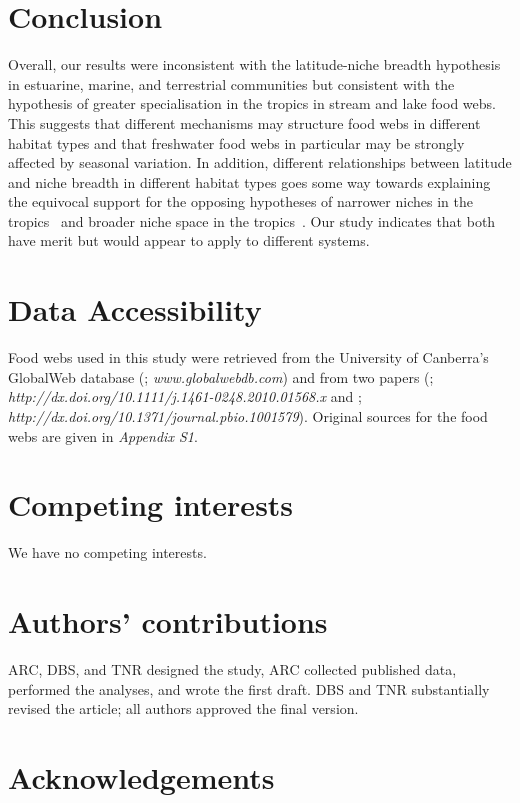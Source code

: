 \documentclass[12pt]{article}
\begin{document}
\section*{Conclusion}

  Overall, our results were inconsistent with the latitude-niche breadth
  hypothesis in estuarine, marine, and terrestrial communities but consistent
  with the hypothesis of greater specialisation in the tropics in stream and
  lake food webs. This suggests that different mechanisms may structure food
  webs in different habitat types and that freshwater food webs in particular
  may be strongly affected by seasonal variation. In addition, different
  relationships between latitude and niche breadth in different habitat types
  goes some way towards explaining the equivocal support for the opposing
  hypotheses of narrower niches in the tropics~\cite{Vazquez2004} and broader
  niche space in the tropics~\cite{Davies2007}. Our study indicates that both 
  have merit but would appear to apply to different systems.

\section*{Data Accessibility}

  Food webs used in this study were retrieved from the University of Canberra's 
  GlobalWeb database (\cite{GlobalWeb}; \emph{www.globalwebdb.com}) and from
  two papers (\cite{Riede2011}; \emph{http://dx.doi.org/10.1111/j.1461-0248.2010.01568.x}
  and \cite{Dunne2013}; \emph{http://dx.doi.org/10.1371/journal.pbio.1001579}). Original sources for the
  food webs are given in \emph{Appendix S1}.

\section*{Competing interests}
  
  We have no competing interests.

\section*{Authors' contributions}
  
  ARC, DBS, and TNR designed the study, ARC collected
  published data, performed the analyses, and wrote the
  first draft. DBS and TNR substantially revised the article;
  all authors approved the final version.


\section*{Acknowledgements}
  
\end{document}
